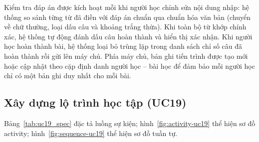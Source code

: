 Kiểm tra đáp án được kích hoạt mỗi khi người học chỉnh sửa nội dung nhập: hệ thống so sánh từng từ đã điền với đáp án chuẩn qua chuẩn hóa văn bản (chuyển về chữ thường, loại dấu câu và khoảng trắng thừa). Khi toàn bộ từ khớp chính xác, hệ thống tự động đánh dấu câu hoàn thành và hiển thị xác nhận. Khi người học hoàn thành bài, hệ thống loại bỏ trùng lặp trong danh sách chỉ số câu đã hoàn thành rồi gửi lên máy chủ. Phía máy chủ, bản ghi tiến trình được tạo mới hoặc cập nhật theo cặp định danh người học -- bài học để đảm bảo mỗi người học chỉ có một bản ghi duy nhất cho mỗi bài.

\subsection{Xây dựng lộ trình học tập (UC19)}
Bảng~\ref{tab:uc19_spec} đặc tả luồng sự kiện; hình~\ref{fig:activity-uc19} thể hiện sơ đồ activity; hình~\ref{fig:sequence-uc19} thể hiện sơ đồ tuần tự.
